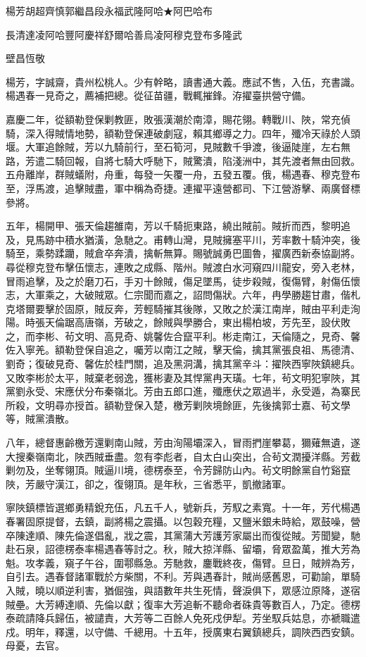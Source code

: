 
\begin{pinyinscope}
楊芳胡超齊慎郭繼昌段永福武隆阿哈★阿巴哈布

長清達凌阿哈豐阿慶祥舒爾哈善烏凌阿穆克登布多隆武

壁昌恆敬

楊芳，字誠齋，貴州松桃人。少有幹略，讀書通大義。應試不售，入伍，充書識。楊遇春一見奇之，薦補把總。從征苗疆，戰輒摧鋒。洊擢臺拱營守備。

嘉慶二年，從額勒登保剿教匪，敗張漢潮於南漳，賜花翎。轉戰川、陜，常充偵騎，深入得賊情地勢，額勒登保連破劇寇，賴其鄉導之力。四年，殲冷天祿於人頭堰。大軍追餘賊，芳以九騎前行，至石筍河，見賊數千爭渡，後逼陡崖，左右無路，芳遣二騎回報，自將七騎大呼馳下，賊驚潰，陷淺洲中，其先渡者無由回救。五舟離岸，群賊蟻附，舟重，每發一矢覆一舟，五發五覆。俄，楊遇春、穆克登布至，浮馬渡，追擊賊盡，軍中稱為奇捷。連擢平遠營都司、下江營游擊、兩廣督標參將。

五年，楊開甲、張天倫趨雒南，芳以千騎扼東路，繞出賊前。賊折而西，黎明追及，見馬跡中積水猶潢，急馳之。甫轉山灣，見賊擁塞平川，芳率數十騎沖突，後騎至，乘勢蹂躪，賊倉卒奔潰，擒斬無算。賜號誠勇巴圖魯，擢廣西新泰協副將。尋從穆克登布擊伍懷志，連敗之成縣、階州。賊渡白水河窺四川龍安，旁入老林，冒雨追擊，及之於磨刀石，手刃十餘賊，傷足墜馬，徒步殺賊，復傷臂，射傷伍懷志，大軍乘之，大破賊眾。仁宗聞而嘉之，詔問傷狀。六年，冉學勝趨甘肅，偕札克塔爾要擊於固原，賊反奔，芳輕騎摧其後隊，又敗之於漢江南岸，賊由平利走洵陽。時張天倫踞高唐嶺，芳破之，餘賊與學勝合，東出楊柏坡，芳先至，設伏敗之，而李彬、茍文明、高見奇、姚馨佐合竄平利。彬走南江，天倫隨之，見奇、馨佐入寧羌。額勒登保自追之，囑芳以南江之賊，擊天倫，擒其黨張良祖、馬德清、劉奇；復破見奇、馨佐於桂門關，追及黑洞溝，擒其黨辛斗：擢陜西寧陜鎮總兵。又敗李彬於太平，賊棄老弱逸，獲彬妻及其悍黨冉天璜。七年，茍文明犯寧陜，其黨劉永受、宋應伏分布秦嶺北。芳由五郎口進，殲應伏之眾過半，永受遁，為寨民所殺，文明尋亦授首。額勒登保入楚，檄芳剿陜境餘匪，先後擒郭士嘉、茍文學等，賊黨潰散。

八年，總督惠齡檄芳還剿南山賊，芳由洵陽壩深入，冒雨捫崖攀葛，獮薙無遺，遂大搜秦嶺南北，陜西賊垂盡。忽有李彪者，自太白山突出，合茍文潤擾洋縣。芳截剿勿及，坐奪翎頂。賊逼川境，德楞泰至，令芳歸防山內。茍文明餘黨自竹谿竄陜，芳嚴守漢江，卻之，復翎頂。是年秋，三省悉平，凱撤諸軍。

寧陜鎮標皆選鄉勇精銳充伍，凡五千人，號新兵，芳馭之素寬。十一年，芳代楊遇春署固原提督，去鎮，副將楊之震攝。以包穀充糧，又鹽米銀未時給，眾鼓噪，營卒陳達順、陳先倫遂倡亂，戕之震，其黨蒲大芳護芳家屬出而復從賊。芳聞變，馳赴石泉，詔德楞泰率楊遇春等討之。秋，賊大掠洋縣、留壩，脅眾盈萬，推大芳為魁。攻孝義，窺子午谷，圍鄠縣急。芳馳救，鏖戰終夜，傷臂。旦日，賊辨為芳，自引去。遇春督諸軍戰於方柴關，不利。芳與遇春計，賊尚感舊恩，可勸諭，單騎入賊，曉以順逆利害，猶倔強，與語數年共生死情，聲淚俱下，眾感泣原降，遂宿賊壘。大芳縛達順、先倫以獻；復率大芳追斬不聽命者硃貴等數百人，乃定。德楞泰疏請降兵歸伍，被譴責，大芳等二百餘人免死戍伊犁。芳坐馭兵姑息，亦褫職遣戍。明年，釋還，以守備、千總用。十五年，授廣東右翼鎮總兵，調陜西西安鎮。母憂，去官。


\end{pinyinscope}
